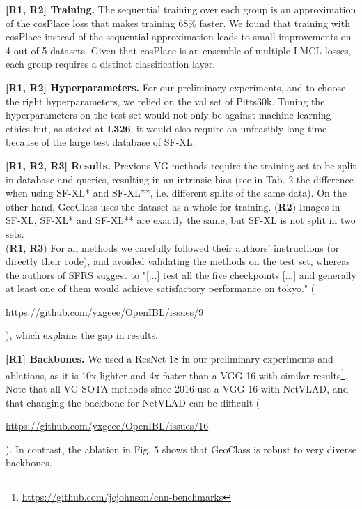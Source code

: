 \documentclass[10pt,twocolumn,letterpaper]{article}
\newcommand{\RI}{{\color{red}\textbf{R1}}}
\newcommand{\RII}{{\color{ForestGreen}\textbf{R2}}}
\newcommand{\RIII}{{\color{blue}\textbf{R3}}}
\newcommand{\myparagraph}[1]{\vspace{-0.5pt}\noindent\textbf{#1}}
\begin{document}
\myparagraph{[{\RI, \RII}] Training.} 
The sequential training over each group is an approximation of the cosPlace loss that makes training 68\% faster.
We found that training with cosPlace instead of the sequential approximation leads to small improvements on 4 out of 5 datasets.
Given that cosPlace is an ensemble of multiple LMCL losses, each group requires a distinct classification layer.





\myparagraph{[{\RI, \RII}] Hyperparameters.} 
For our preliminary experiments, and to choose the right hyperparameters, we relied on the val set of Pitts30k. Tuning the hyperparameters on the test set would not only be against machine learning ethics but, as stated at \textbf{L326}, it would also require an unfeasibly long time because of the large test database of SF-XL.













\myparagraph{[{\RI, \RII, \RIII}] Results.} 
Previous VG methods require the training set to be split in database and queries, resulting in an intrinsic bias (see in Tab. 2 the difference when using SF-XL* and SF-XL**, i.e. different splits of the same data).
On the other hand, GeoClass uses the dataset as a whole for training.
({\RII}) Images in SF-XL, SF-XL* and SF-XL** are exactly the same, but SF-XL is not split in two sets. \\
({\RI}, {\RIII}) For all methods we carefully followed their authors' instructions (or directly their code), and avoided validating the methods on the test set, whereas the authors of SFRS suggest to "[...] test all the five checkpoints [...] and generally at least one of them would achieve satisfactory performance on tokyo." (\begin{footnotesize}\url{https://github.com/yxgeee/OpenIBL/issues/9}\end{footnotesize}), which explains the gap in results.











\myparagraph{[{\RI}] Backbones.} 
We used a ResNet-18 in our preliminary experiments and ablations, as it is 10x lighter and 4x faster than a VGG-16 with similar results\footnote{\url{https://github.com/jcjohnson/cnn-benchmarks}}.
Note that all VG SOTA methods since 2016 use a VGG-16 with NetVLAD, and that changing the backbone for NetVLAD can be difficult (\begin{footnotesize}\url{https://github.com/yxgeee/OpenIBL/issues/16}\end{footnotesize}).
In contrast, the ablation in Fig. 5 shows that GeoClass is robust to very diverse backbones.
\end{document}
